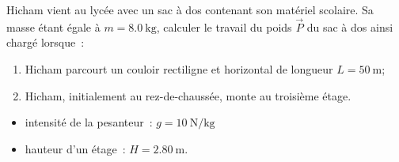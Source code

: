 Hicham vient au lycée avec un sac à dos contenant son matériel scolaire. Sa
masse étant égale à $m=\qty{8.0}{\kg}$, calculer le travail du poids $\vec{P}$
du sac à dos ainsi chargé lorsque~:
\begin{enumerate}
    \item Hicham parcourt un couloir rectiligne et horizontal de longueur
          $L=\qty{50}{\m}$;
    \item Hicham, initialement au rez-de-chaussée, monte au troisième étage.
\end{enumerate}
\begin{donnees}
    \begin{itemize}
        \item intensité de la pesanteur~: $g=\qty{10}{\N\per\kg}$
        \item hauteur d'un étage~: $H=\qty{2.80}{\m}$.
    \end{itemize}
\end{donnees}

